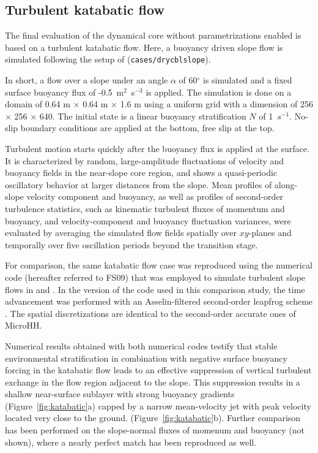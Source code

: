 \documentclass[gmd]{copernicus}
\begin{document}
\subsection{Turbulent katabatic flow}
The final evaluation of the dynamical core without parametrizations enabled is based on a turbulent katabatic flow. Here, a buoyancy driven slope flow is simulated following the setup of \citet{Fedorovich2009} (\texttt{cases/drycblslope}).

In short, a flow over a slope under an angle $\alpha$ of 60$^\circ$ is simulated and a fixed surface buoyancy flux of -0.5~m$^2$~s$^{-3}$ is applied. The simulation is done on a domain of 0.64 m $\times$ 0.64 m $\times$ 1.6 m using a uniform grid with a dimension of 256 $\times$ 256 $\times$ 640. The initial state is a linear buoyancy stratification $N$ of 1~$s^{-1}$. No-slip boundary conditions are applied at the bottom, free slip at the top.

Turbulent motion starts quickly after the buoyancy flux is applied at the surface. It is characterized by random, large-amplitude fluctuations of velocity and buoyancy fields in the near-slope core region, and shows a quasi-periodic oscillatory behavior at larger distances from the slope. Mean profiles of along-slope velocity component and buoyancy, as well as profiles of second-order turbulence statistics, such as kinematic turbulent fluxes of momentum and buoyancy, and velocity-component and buoyancy fluctuation variances, were evaluated by averaging the simulated flow fields spatially over $xy$-planes and temporally over five oscillation periods beyond the transition stage.

For comparison, the same katabatic flow case was reproduced using the numerical code (hereafter referred to FS09) that was employed to simulate turbulent slope flows in \citet{Shapiro2008} and \citet{Fedorovich2009}. In the version of the code used in this comparison study, the time advancement was performed with an Asselin-filtered second-order leapfrog scheme \citep{Durran2013}. The spatial discretizations are identical to the second-order accurate ones of MicroHH. 

Numerical results obtained with both numerical codes testify that stable environmental stratification in combination with negative surface buoyancy forcing in the katabatic flow leads to an effective suppression of vertical turbulent exchange in the flow region adjacent to the slope. This suppression results in a shallow near-surface sublayer with strong buoyancy gradients (Figure~\ref{fig:katabatic}a) capped by a narrow mean-velocity jet with peak velocity located very close to the ground. (Figure~\ref{fig:katabatic}b). Further comparison has been performed on the slope-normal fluxes of momenum and buoyancy (not shown), where a nearly perfect match has been reproduced as well.
\end{document}
